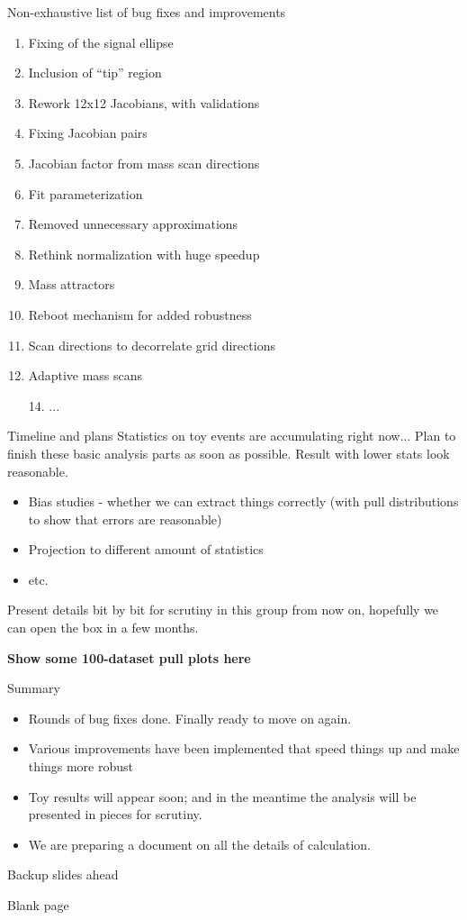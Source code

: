 \documentclass[11pt,t]{beamer}
\begin{document}
\begin{frame}{Non-exhaustive list of bug fixes and improvements}
   \begin{enumerate}
   \item Fixing of the signal ellipse
   \item Inclusion of ``tip'' region
   \item Rework 12x12 Jacobians, with validations
   \item Fixing Jacobian pairs
   \item Jacobian factor from mass scan directions
   \item Fit parameterization 
   \item Removed unnecessary approximations
   \item Rethink normalization with huge speedup
   \item Mass attractors
   \item Reboot mechanism for added robustness
   \item Scan directions to decorrelate grid directions
   \item Adaptive mass scans
   \item[14.] ...
   \end{enumerate}
\end{frame}

\begin{frame}{Timeline and plans}
   Statistics on toy events are accumulating right now...  Plan to finish these basic analysis parts as soon as possible.
   Result with lower stats look reasonable.
   \begin{itemize}
   \item Bias studies - whether we can extract things correctly (with pull distributions to show that errors are reasonable)
   \item Projection to different amount of statistics
   \item etc.
   \end{itemize}
   Present details bit by bit for scrutiny in this group from now on, hopefully we can open the box in a few months.

   \textbf{Show some 100-dataset pull plots here}
\end{frame}

\begin{frame}{Summary}
   \begin{itemize}
   \item Rounds of bug fixes done.  Finally ready to move on again.
   \item Various improvements have been implemented that speed things up and make things more robust
   \item Toy results will appear soon; and in the meantime the analysis will be presented in pieces for scrutiny.
   \item We are preparing a document on all the details of calculation.
   \end{itemize}
\end{frame}

\begin{frame}{Backup slides ahead}
\end{frame}

\begin{frame}{Blank page}
\end{frame}
\end{document}
